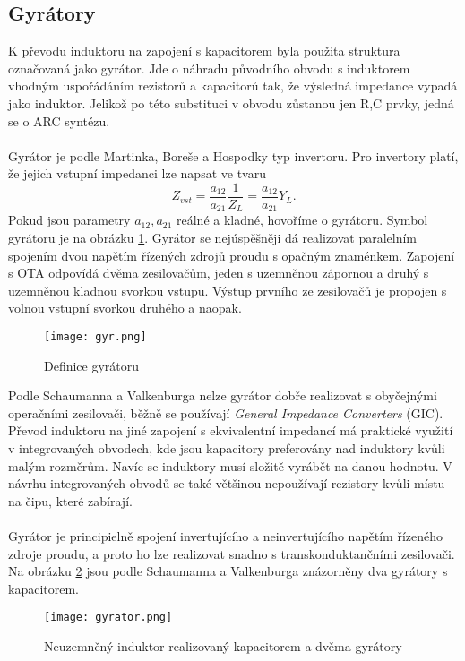 \subsection{Gyrátory}\label{s:GYR}
\noindent K převodu induktoru na zapojení s kapacitorem byla použita struktura označovaná jako gyrátor. Jde o náhradu původního obvodu s induktorem vhodným uspořádáním rezistorů a kapacitorů tak, že výsledná impedance vypadá jako induktor. Jelikož po této substituci v obvodu zůstanou jen R,C prvky, jedná se o ARC syntézu. \\
\\
 Gyrátor je podle Martinka, Boreše a Hospodky \cite{12} typ invertoru. Pro invertory platí, že jejich vstupní impedanci lze napsat ve tvaru\begin{equation}
Z_{vst} = \frac{a_{12}}{a_{21}}\frac{1}{Z_L} = \frac{a_{12}}{a_{21}}Y_L.
\end{equation}
Pokud jsou parametry $a_{12}, a_{21}$ reálné a kladné, hovoříme o gyrátoru. Symbol gyrátoru je na obrázku \ref{s:G}. Gyrátor se nejúspěšněji dá realizovat paralelním spojením dvou napětím řízených zdrojů proudu s opačným znaménkem. Zapojení s OTA odpovídá dvěma zesilovačům, jeden s uzemněnou zápornou a druhý s uzemněnou kladnou svorkou vstupu. Výstup prvního ze zesilovačů je propojen s volnou vstupní svorkou druhého a naopak.
\begin{figure}[h]
\centering
\texttt{[image: gyr.png]}
\caption{Definice gyrátoru \label{s:G}}
\end{figure}
Podle Schaumanna a Valkenburga \cite{13} nelze gyrátor dobře realizovat s obyčejnými operačními zesilovači, běžně se používají \textit{General Impedance Converters} (GIC). Převod induktoru na jiné zapojení s ekvivalentní impedancí má praktické využití v integrovaných obvodech, kde jsou kapacitory preferovány nad induktory kvůli malým rozměrům. Navíc se induktory musí složitě vyrábět na danou hodnotu. V návrhu integrovaných obvodů se také většinou nepoužívají rezistory kvůli místu na čipu, které zabírají. \\
\\
Gyrátor je principielně spojení invertujícího a neinvertujícího napětím řízeného zdroje proudu, a proto ho lze realizovat snadno s transkonduktančními zesilovači. Na obrázku \ref{s:GO} jsou podle Schaumanna a Valkenburga \cite{13} znázorněny dva gyrátory s kapacitorem. 
\begin{figure}[h]
\centering
\texttt{[image: gyrator.png]}
\caption[Neuzemněný induktor realizovaný kapacitorem a dvěma gyrátory]{Neuzemněný induktor realizovaný kapacitorem a dvěma gyrátory \label{s:GO}}
\end{figure}
